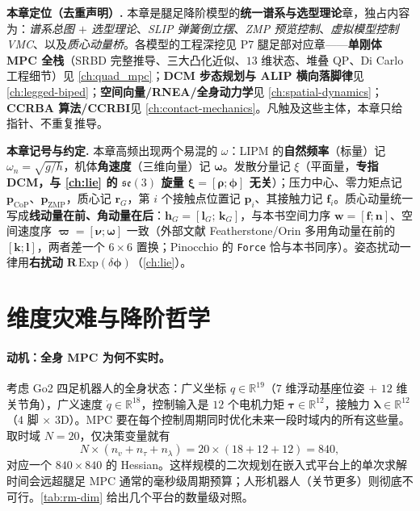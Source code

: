 \begin{note}
\textbf{本章定位（去重声明）.}\;
本章是腿足降阶模型的\textbf{统一谱系与选型理论}章，独占内容为：\emph{谱系总图 $+$ 选型理论}、\emph{SLIP 弹簧倒立摆}、\emph{ZMP 预览控制}、\emph{虚拟模型控制 VMC}、以及\emph{质心动量桥}。各模型的工程深挖见 P7 腿足部对应章——\textbf{单刚体 MPC 全栈}（SRBD 完整推导、三大凸化近似、$13$ 维状态、堆叠 QP、Di Carlo 工程细节）见 \cref{ch:quad_mpc}；\textbf{DCM 步态规划与 ALIP 横向落脚律}见 \cref{ch:legged-biped}；\textbf{空间向量/RNEA/全身动力学}见 \cref{ch:spatial-dynamics}；\textbf{CCRBA 算法/CCRBI}见 \cref{ch:contact-mechanics}。凡触及这些主体，本章只给指针、不重复推导。
\end{note}

\begin{note}
\textbf{本章记号与约定.}\;
本章高频出现两个易混的 $\omega$：LIPM 的\textbf{自然频率}（标量）记 $\omega_n=\sqrt{g/h}$，机体\textbf{角速度}（三维向量）记 $\boldsymbol{\omega}$。发散分量记 $\xi$（平面量，\textbf{专指 DCM，与 \cref{ch:lie} 的 $\mathfrak{se}(3)$ 旋量 $\boldsymbol{\xi}=[\boldsymbol{\rho};\boldsymbol{\phi}]$ 无关}）；压力中心、零力矩点记 $\mathbf{p}_{\mathrm{CoP}}$、$\mathbf{p}_{\mathrm{ZMP}}$，质心记 $\mathbf{r}_G$，第 $i$ 个接触点位置记 $\mathbf{p}_i$、其接触力记 $\mathbf{f}_i$。质心动量统一写成\textbf{线动量在前、角动量在后}：$\mathbf{h}_G=[\mathbf{l}_G;\,\mathbf{k}_G]$，与本书空间力序 $\mathbf{w}=[\mathbf{f};\mathbf{n}]$、空间速度序 $\boldsymbol{\varpi}=[\boldsymbol{\nu};\boldsymbol{\omega}]$ 一致（外部文献 Featherstone/Orin 多用角动量在前的 $[\mathbf{k};\mathbf{l}]$，两者差一个 $6\times 6$ 置换；Pinocchio 的 \texttt{Force} 恰与本书同序）。姿态扰动一律用\textbf{右扰动} $\mathbf{R}\,\mathrm{Exp}(\delta\boldsymbol{\phi})$（\cref{ch:lie}）。
\end{note}

\section{维度灾难与降阶哲学}
\label{sec:rm-curse}

\paragraph{动机：全身 MPC 为何不实时。}
考虑 Go2 四足机器人的全身状态：广义坐标 $q\in\mathbb{R}^{19}$（$7$ 维浮动基座位姿 $+$ $12$ 维关节角），广义速度 $\dot{q}\in\mathbb{R}^{18}$，控制输入是 $12$ 个电机力矩 $\boldsymbol{\tau}\in\mathbb{R}^{12}$，接触力 $\boldsymbol{\lambda}\in\mathbb{R}^{12}$（$4$ 脚 $\times$ $3$D）。MPC 要在每个控制周期同时优化未来一段时域内的所有这些量。取时域 $N=20$，仅决策变量就有
\begin{equation}
  N\times(n_v+n_\tau+n_\lambda)=20\times(18+12+12)=840,
  \label{eq:rm-decision-count}
\end{equation}
对应一个 $840\times 840$ 的 Hessian。这样规模的二次规划在嵌入式平台上的单次求解时间会远超腿足 MPC 通常的毫秒级周期预算；人形机器人（关节更多）则彻底不可行。\cref{tab:rm-dim} 给出几个平台的数量级对照。

